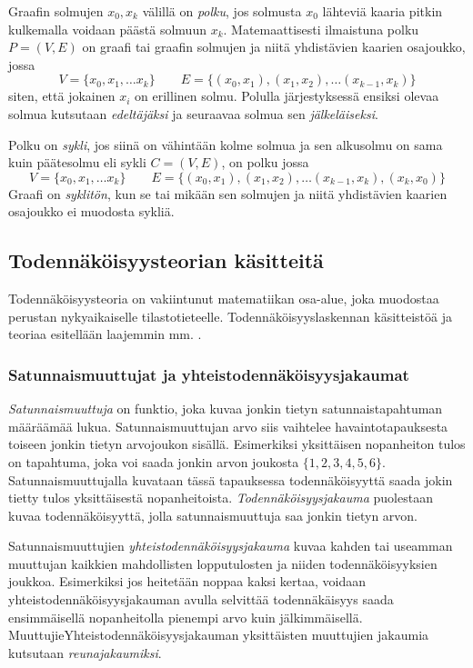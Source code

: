 Graafin solmujen $x_0, x_k$ välillä on \emph{polku}, jos solmusta $x_0$ lähteviä kaaria pitkin kulkemalla voidaan päästä solmuun $x_k$. Matemaattisesti ilmaistuna polku $P=(V,E)$ on graafi tai graafin solmujen ja niitä yhdistävien kaarien osajoukko, jossa 
$$
    V = \{x_0, x_1, \ldots x_k \} \qquad E = \{(x_0, x_1), (x_1,x_2),\ldots(x_{k-1}, x_k)\}
$$ 
siten, että jokainen $x_i$ on erillinen solmu. Polulla järjestyksessä ensiksi olevaa solmua kutsutaan \emph{edeltäjäksi} ja seuraavaa solmua sen \emph{jälkeläiseksi}.

Polku on \emph{sykli}, jos siinä on vähintään kolme solmua ja sen alkusolmu on sama kuin päätesolmu eli sykli $C = (V, E)$, on polku jossa
$$
    V = \{x_0, x_1, \ldots x_k \} \qquad E = \{(x_0, x_1), (x_1,x_2),\ldots(x_{k-1}, x_k), (x_k, x_0)\}
$$
Graafi on \emph{syklitön}, kun se tai mikään sen solmujen ja niitä yhdistävien kaarien osajoukko ei muodosta sykliä. 

\subsection{Todennäköisyysteorian käsitteitä}
Todennäköisyysteoria on vakiintunut matematiikan osa-alue, joka muodostaa perustan nykyaikaiselle tilastotieteelle. Todennäköisyyslaskennan käsitteistöä ja teoriaa esitellään laajemmin mm. \citet{dasgupta_probability_2011}.

\subsubsection{Satunnaismuuttujat ja yhteistodennäköisyysjakaumat}
\emph{Satunnaismuuttuja} on funktio, joka kuvaa jonkin tietyn satunnaistapahtuman määräämää lukua. Satunnaismuuttujan arvo siis vaihtelee havaintotapauksesta toiseen jonkin tietyn arvojoukon sisällä. Esimerkiksi yksittäisen nopanheiton tulos on tapahtuma, joka voi saada jonkin arvon joukosta $\{1,2,3,4,5,6\}$. Satunnaismuuttujalla kuvataan tässä tapauksessa todennäköisyyttä saada jokin tietty tulos yksittäisestä nopanheitoista. \emph{Todennäköisyysjakauma} puolestaan kuvaa todennäköisyyttä, jolla satunnaismuuttuja saa jonkin tietyn arvon.

Satunnaismuuttujien \emph{yhteistodennäköisyysjakauma} kuvaa kahden tai useamman muuttujan kaikkien mahdollisten lopputulosten ja niiden todennäköisyyksien joukkoa. Esimerkiksi jos heitetään noppaa kaksi kertaa, voidaan yhteistodennäköisyysjakauman avulla selvittää todennäkäisyys saada ensimmäisellä nopanheitolla pienempi arvo kuin jälkimmäisellä. MuuttujieYhteistodennäköisyysjakauman yksittäisten muuttujien jakaumia kutsutaan \emph{reunajakaumiksi}.

